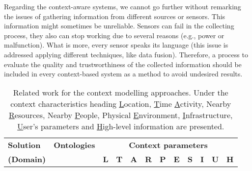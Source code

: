 Regarding the context-aware systems, we cannot go further without remarking the 
issues of gathering information from different sources or sensors. This 
information might sometimes be unreliable. Sensors can fail in the collecting 
process, they also can stop working due to several reasons (e.g., power or 
malfunction). What is more, every sensor speaks its language (this issue is 
addressed applying different techniques, like data fusion). Therefore, a process 
to evaluate the quality and trustworthiness of the collected information should 
be included in every context-based system as a method to avoid undesired results.

\begin{table}[H]
 \caption{Related work for the context modelling approaches. Under the context
  characteristics heading \underline{L}ocation, \underline{T}ime
  \underline{A}ctivity, Nearby \underline{R}esources, Nearby \underline{P}eople,
  Physical \underline{E}nvironment, \underline{I}nfrastructure, \underline{U}ser's
  parameters and \underline{H}igh-level information are presented.}
 \label{tbl:context_comparison}
 \footnotesize
 \centering

\begin{tabular}{l c c c c c c c c c c c }
  \hline 
 \textbf{Solution} & \textbf{Ontologies} & \multicolumn{10}{c}{\textbf{Context parameters}} \\
 
 \textbf{(Domain)} & & \textbf{L} & \textbf{T} & \textbf{A} & \textbf{R} & \textbf{P} & \textbf{E} & \textbf{S} & \textbf{I} & \textbf{U} & \textbf{H}\\
    \hline 
        

\end{tabular}
\end{table}

